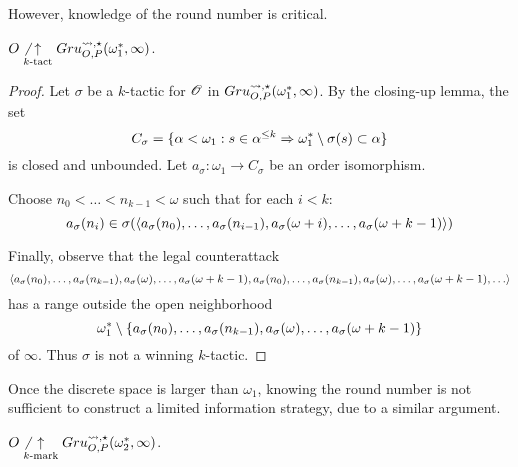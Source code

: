 However, knowledge of the round number is critical.

\begin{thm}
  $O\not\underset{k\text{-tact}}{\uparrow}Gru_{O,P}^{\leadsto,\star}(\omega^*_1,\infty)$.
\end{thm}

\begin{proof}
  Let $\sigma$ be a $k$-tactic for $\mathscr{O}$ in
  $Gru_{O,P}^{\leadsto,\star}(\omega^*_1,\infty)$. By the closing-up lemma, the set
    \[
      C_\sigma
        =
      \{
        \alpha<\omega_1
          :
        s\in\alpha^{\leq k}
          \Rightarrow
        \omega^*_1\setminus\sigma(s)
        \subset \alpha
      \}
    \]
  is closed and unbounded. Let $a_\sigma:\omega_1\to C_\sigma$ be an order
  isomorphism.

  Choose $n_0<\dots<n_{k-1}<\omega$ such that for each $i<k$:
    \[
      a_\sigma(n_i)
        \in
      \sigma(
        \langle a_\sigma(n_0),\dots,a_\sigma(n_{i-1}),
          a_\sigma(\omega+i),\dots,a_\sigma(\omega+k-1)\rangle
      )
    \]

  Finally, observe that the legal counterattack
    \[
      \<a_\sigma(n_0),\dots,a_\sigma(n_{k-1}),
        a_\sigma(\omega),\dots,a_\sigma(\omega+k-1),
        a_\sigma(n_0),\dots,a_\sigma(n_{k-1}),
        a_\sigma(\omega),\dots,a_\sigma(\omega+k-1),
        \dots\>
    \]
  has a range outside the open neighborhood %
    \[
      \omega^*_1
        \setminus
      \{a_\sigma(n_0),\dots,a_\sigma(n_{k-1}),
        a_\sigma(\omega),\dots,a_\sigma(\omega+k-1)\}
    \]
  of $\infty$. Thus $\sigma$ is not a winning $k$-tactic.
\end{proof}

Once the discrete space is larger than $\omega_1$, knowing the round number
is not sufficient to construct a limited information strategy, due to a
similar argument.

\begin{thm}
  $O\not\underset{k\text{-mark}}{\uparrow}Gru_{O,P}^{\leadsto,\star}(\omega^*_2,\infty)$.
\end{thm}

